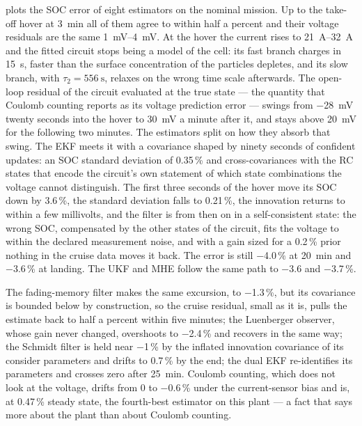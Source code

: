 plots the SOC error of eight estimators on the nominal mission. Up to
the take-off hover at \SI{3}{\minute} all of them agree to within half a percent and their
voltage residuals are the same \SIrange{1}{4}{\milli\volt}. At the hover the current rises to
\SIrange{21}{32}{\ampere} and the fitted circuit stops being a model of the cell: its fast branch
charges in \SI{15}{\second}, faster than the surface concentration of the particles depletes, and
its slow branch, with $\tau_2 = \SI{556}{\second}$, relaxes on the wrong time scale afterwards.
The open-loop residual of the circuit evaluated at the true state --- the quantity that Coulomb
counting reports as its voltage prediction error --- swings from \SI{-28}{\milli\volt} twenty
seconds into the hover to \SI{+30}{\milli\volt} a minute after it, and stays above
\SI{20}{\milli\volt} for the following two minutes. The estimators split on how they absorb
that swing. The EKF meets it with a covariance shaped by ninety seconds of confident updates:
an SOC standard deviation of \num{0.35}\,\% and cross-covariances with the RC states that
encode the circuit's own statement of which state combinations the voltage cannot
distinguish. The first three seconds of the hover move its SOC down by \num{3.6}\,\%, the standard
deviation falls to \num{0.21}\,\%, the innovation returns to within a few millivolts, and the
filter is from then on in a self-consistent state: the wrong SOC, compensated by the other
states of the circuit, fits the voltage to within the declared measurement noise, and with a
gain sized for a \num{0.2}\,\% prior nothing in the cruise data moves it back. The error is
still \num{-4.0}\,\% at \SI{20}{\minute} and \num{-3.6}\,\% at landing. The UKF and MHE follow
the same path to \num{-3.6} and \num{-3.7}\,\%.

The fading-memory filter makes the same excursion, to \num{-1.3}\,\%, but its covariance is
bounded below by construction, so the cruise residual, small as it is, pulls the estimate back
to half a percent within five minutes; the Luenberger observer, whose gain never changed,
overshoots to \num{-2.4}\,\% and recovers in the same way; the Schmidt filter is held near
\num{-1}\,\% by the inflated innovation covariance of its consider parameters and drifts to
\num{+0.7}\,\% by the end; the dual EKF re-identifies its parameters and crosses zero after
\SI{25}{\minute}. Coulomb counting, which does not look at the voltage, drifts from \num{0}
to \num{-0.6}\,\% under the current-sensor bias and is, at \num{0.47}\,\% steady state, the
fourth-best estimator on this plant --- a fact that says more about the plant than about
Coulomb counting.

